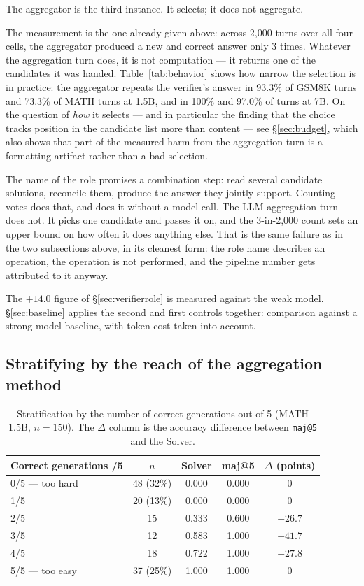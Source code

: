 \documentclass[11pt,a4paper]{article}
\begin{document}
The aggregator is the third instance. It selects; it does not aggregate.

The measurement is the one already given above: across 2{,}000 turns over all four cells, the aggregator produced a new and correct answer only 3 times. Whatever the aggregation turn does, it is not computation --- it returns one of the candidates it was handed. Table~\ref{tab:behavior} shows how narrow the selection is in practice: the aggregator repeats the verifier's answer in 93.3\% of GSM8K turns and 73.3\% of MATH turns at 1.5B, and in 100\% and 97.0\% of turns at 7B. On the question of \emph{how} it selects --- and in particular the finding that the choice tracks position in the candidate list more than content --- see \S\ref{sec:budget}, which also shows that part of the measured harm from the aggregation turn is a formatting artifact rather than a bad selection.

The name of the role promises a combination step: read several candidate solutions, reconcile them, produce the answer they jointly support. Counting votes does that, and does it without a model call. The LLM aggregation turn does not. It picks one candidate and passes it on, and the 3-in-2{,}000 count sets an upper bound on how often it does anything else. That is the same failure as in the two subsections above, in its cleanest form: the role name describes an operation, the operation is not performed, and the pipeline number gets attributed to it anyway.

The $+14.0$ figure of \S\ref{sec:verifierrole} is measured against the weak model. \S\ref{sec:baseline} applies the second and first controls together: comparison against a strong-model baseline, with token cost taken into account.

\subsection{Stratifying by the reach of the aggregation method}\label{sec:denominator}

\begin{table}[h]\centering\small
\begin{tabular}{@{}l c c c c@{}}
\toprule
Correct generations /5 & $n$ & Solver & maj@5 & $\Delta$ (points)\\
\midrule
0/5 --- too hard & 48 (32\%) & 0.000 & 0.000 & 0\\
1/5 & 20 (13\%) & 0.000 & 0.000 & 0\\
2/5 & 15 & 0.333 & 0.600 & $+26.7$\\
3/5 & 12 & 0.583 & 1.000 & $+41.7$\\
4/5 & 18 & 0.722 & 1.000 & $+27.8$\\
5/5 --- too easy & 37 (25\%) & 1.000 & 1.000 & 0\\
\bottomrule
\end{tabular}
\caption{Stratification by the number of correct generations out of 5 (MATH 1.5B, $n=150$). The $\Delta$ column is the accuracy difference between \texttt{maj@5} and the Solver.}
\label{tab:strata}
\end{table}
\end{document}
